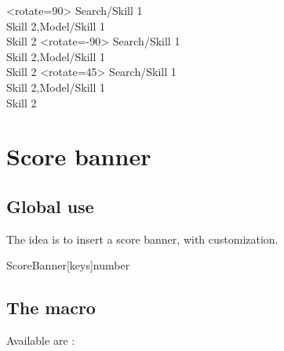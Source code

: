 \documentclass[english,11pt,a4paper]{article}
\begin{document}
\begin{demohigh}[language=latex/latex3,style/main=teal!25,style/code=teal!25]
\PencilSkills[Scale=0.75,BlockWidth=3cm]<rotate=90>{
    Search/Skill 1\\Skill 2,Model/{Skill 1\\Skill 2}}
\hspace{1cm}
\PencilSkills[Scale=0.75,BlockWidth=3cm]<rotate=-90>{
    Search/Skill 1\\Skill 2,Model/{Skill 1\\Skill 2}}
\hspace{1cm}
\PencilSkills[Scale=0.75,BlockWidth=3cm,BlackWhite]<rotate=45>{
    Search/Skill 1\\Skill 2,Model/{Skill 1\\Skill 2}}
\end{demohigh}

\pagebreak

\section{Score banner}

\subsection{Global use}

The idea is to insert a score banner, with customization.

\begin{codehigh}[language=latex/latex3,style/main=teal!25,style/code=teal!25]
ScoreBanner[keys]{number}
\end{codehigh}

\begin{demohigh}[language=latex/latex3,style/main=teal!25,style/code=teal!25]
\ScoreBanner{}
\end{demohigh}

\subsection{The macro}

Available  are :
\end{document}
